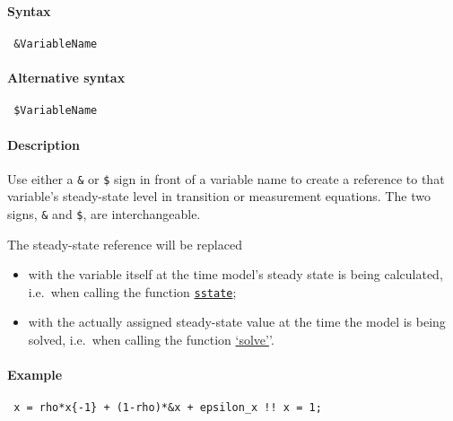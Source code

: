 


	\paragraph{Syntax}
 
 \begin{verbatim}
 &VariableName
 \end{verbatim}
 
 \paragraph{Alternative syntax}
 
 \begin{verbatim}
 $VariableName
 \end{verbatim}
 
 \paragraph{Description}
 
 Use either a \texttt{\&} or \texttt{\$} sign in front of a variable name
 to create a reference to that variable's steady-state level in
 transition or measurement equations. The two signs, \texttt{\&} and
 \texttt{\$}, are interchangeable.
 
 The steady-state reference will be replaced
 
 \begin{itemize}
 \item
   with the variable itself at the time model's steady state is being
   calculated, i.e.~when calling the function
   \href{model/sstate}{\texttt{sstate}};
 \item
   with the actually assigned steady-state value at the time the model is
   being solved, i.e.~when calling the function
   \href{model/solve}{`solve'}'.
 \end{itemize}
 
 \paragraph{Example}
 
 \begin{verbatim}
 x = rho*x{-1} + (1-rho)*&x + epsilon_x !! x = 1;
 \end{verbatim}


